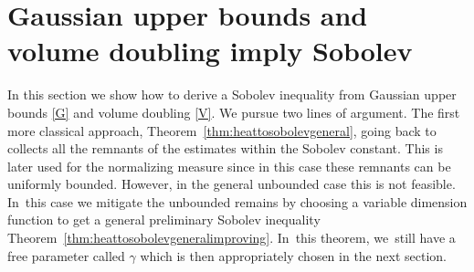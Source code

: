 \documentclass[JEP,XML,SOM,Unicode,published]{cedram}
\theoremstyle{plain}
\theoremstyle{definition}
\begin{document}
\section{{Gaussian} upper bounds and {volume} doubling imply Sobolev}\label{section:GS}

In this section we show how to derive a Sobolev inequality from Gaussian upper bounds \eqref{G} and volume doubling \eqref{V}. We pursue two lines of argument. The first more classical approach, Theorem~\ref{thm:heattosobolevgeneral}, going back to \cite{Varopoulos-85} collects all the remnants of the estimates within the Sobolev constant. This is later used for the normalizing measure since in this case these remnants can be uniformly bounded. However, in the general unbounded case this is not feasible. In~this case we mitigate the unbounded remains by choosing a variable dimension function to get a general preliminary Sobolev inequality Theorem~\ref{thm:heattosobolevgeneralimproving}. In~this theorem, we~still have a free parameter called $ \gamma $ which is then appropriately chosen in the next section.
\end{document}

